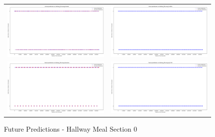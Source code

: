 \begin{figure}
  \begin{tabular}{cc}
    {\includegraphics[width = 3in]{images/results/Future_hallway_M0_Duckett.png}} &
    {\includegraphics[width = 3in]{images/results/Future_hallway_M0_FreMEn.png}} \\
    {\includegraphics[width = 3in]{images/results/Future_hallway_M0_Gaussian.png}} &
    {\includegraphics[width = 3in]{images/results/Future_hallway_M0_HyT-EM.png}} \\
  \end{tabular}
  \caption{Future Predictions - Hallway Meal Section 0}
\end{figure}\\ \\

